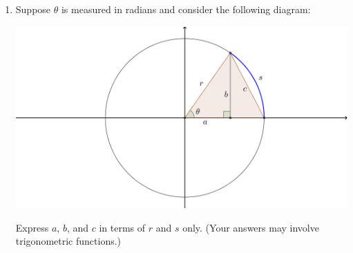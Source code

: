 \documentclass[12pt]{article}
\newif\ifans
\begin{document}
\begin{enumerate}
\ifans\fbox{$h=d\tan\beta-d\tan\alpha$ feet} \fi

\item Suppose $\theta$ is measured in radians and consider the following diagram:
\begin{center}
\includegraphics[scale=0.3]{circle.png}
\end{center}
Express $a$, $b$, and $c$ in terms of $r$ and $s$ only. (Your answers may involve trigonometric functions.)

\ifans{\fbox{\parbox{1\linewidth}{
Notice that $\theta = \frac{s}{r}$.  Then, $a=r\cos\left(\frac{s}{r}\right)$ and $b=r\sin\left(\frac{s}{r}\right)$.  Finally, with $a$ and $b$ as described, one can calculate $c=\sqrt{b^2+(r-a)^2}$.
}}} \fi

\end{enumerate}
\end{document}
